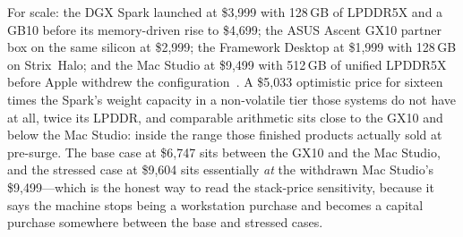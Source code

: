 For scale: the DGX Spark launched at \$3,999 with 128\,GB of LPDDR5X and a GB10 before its memory-driven rise to \$4,699; the ASUS Ascent GX10 partner box on the same silicon at \$2,999; the Framework Desktop at \$1,999 with 128\,GB on Strix~Halo; and the Mac Studio at \$9,499 with 512\,GB of unified LPDDR5X before Apple withdrew the configuration~\cite{dgx-spark-price,framework-desktop,mac-studio-512}. A \$5,033 optimistic price for sixteen times the Spark's weight capacity in a non-volatile tier those systems do not have at all, twice its LPDDR, and comparable arithmetic sits close to the GX10 and below the Mac Studio: inside the range those finished products actually sold at pre-surge. The base case at \$6,747 sits between the GX10 and the Mac Studio, and the stressed case at \$9,604 sits essentially \emph{at} the withdrawn Mac Studio's \$9,499---which is the honest way to read the stack-price sensitivity, because it says the machine stops being a workstation purchase and becomes a capital purchase somewhere between the base and stressed cases.

